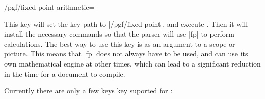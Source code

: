 \begin{key}{/pgf/fixed point arithmetic=}

  This key will set the key path to |/pgf/fixed point|, and 
  execute . Then it will install the necessary 
  commands so that the \pgfname{} parser will use |fp| to perform 
  calculations. 
  The best way to use this key is as an argument to a scope or 
  picture. This means that |fp| does not always have to be used, 
  and \pgfname{} can use its own mathematical engine at other times, 
  which can lead to a significant reduction in the time for a document 
  to compile.
  
\end{key}

  Currently there are only a few keys key suported for :
  
